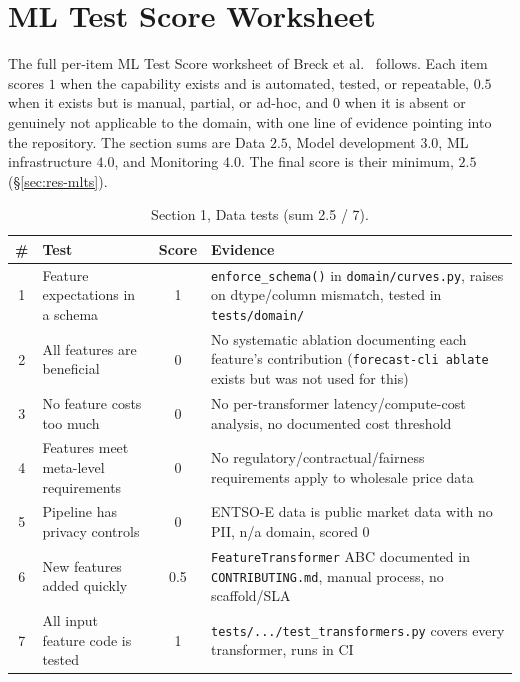 \chapter{ML Test Score Worksheet}
\label{app:mlts-worksheet}

The full per-item ML Test Score worksheet of Breck et
al.~\cite{breck2017mltestscore} follows. Each item scores $1$ when the capability
exists and is automated, tested, or repeatable, $0.5$ when it exists but is
manual, partial, or ad-hoc, and $0$ when it is absent or genuinely not applicable
to the domain, with one line of evidence pointing into the repository. The section
sums are Data $2.5$, Model development $3.0$, ML
infrastructure $4.0$, and Monitoring $4.0$. The final score is their minimum,
$\mathbf{2.5}$ (\S\ref{sec:res-mlts}).

\begin{table}[h]
  \centering
  \footnotesize
  \caption{Section 1, Data tests (sum 2.5 / 7).}
  \renewcommand{\arraystretch}{1.3}
  \begin{tabularx}{\linewidth}{@{}c >{\raggedright\arraybackslash}p{3.9cm} c >{\raggedright\arraybackslash}X@{}}
    \toprule
    \textbf{\#} & \textbf{Test} & \textbf{Score} & \textbf{Evidence} \\
    \midrule
    1 & Feature expectations in a schema & 1 & \texttt{enforce\_schema()} in \texttt{domain/curves.py}, raises on dtype/column mismatch, tested in \texttt{tests/domain/} \\
    2 & All features are beneficial & 0 & No systematic ablation documenting each feature's contribution (\texttt{forecast-cli ablate} exists but was not used for this) \\
    3 & No feature costs too much & 0 & No per-transformer latency/compute-cost analysis, no documented cost threshold \\
    4 & Features meet meta-level requirements & 0 & No regulatory/contractual/fairness requirements apply to wholesale price data \\
    5 & Pipeline has privacy controls & 0 & ENTSO-E data is public market data with no PII, n/a domain, scored 0 \\
    6 & New features added quickly & 0.5 & \texttt{FeatureTransformer} ABC documented in \texttt{CONTRIBUTING.md}, manual process, no scaffold/SLA \\
    7 & All input feature code is tested & 1 & \texttt{tests/.../test\_transformers.py} covers every transformer, runs in CI \\
    \bottomrule
  \end{tabularx}
\end{table}

